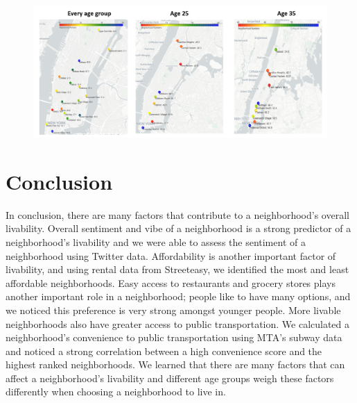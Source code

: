 \documentclass{article}
\begin{document}
\begin{figure}[h]
\centering
\includegraphics[scale=0.60]{map_score_reccom.png}
\end{figure}


\section{Conclusion}
In conclusion, there are many factors that contribute to a neighborhood's overall livability.  Overall sentiment and vibe of a neighborhood is a strong predictor of a neighborhood's livability and we were able to assess the sentiment of a neighborhood using Twitter data.  Affordability is another important factor of livability, and using rental data from Streeteasy, we identified the most and least affordable neighborhoods.  Easy access to restaurants and grocery stores plays another important role in a neighborhood; people like to have many options, and we noticed this preference is very strong amongst younger people.  More livable neighborhoods also have greater access to public transportation.  We calculated a neighborhood's convenience to public transportation using MTA's subway data and noticed a strong correlation between a high convenience score and the highest ranked neighborhoods.  We learned that there are many factors that can affect a neighborhood's livability and different age groups weigh these factors differently when choosing a neighborhood to live in.
\end{document}
